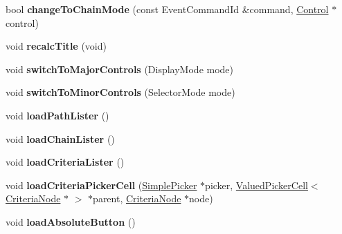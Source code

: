 \begin{DoxyCompactItemize}
\item 
bool {\bfseries change\+To\+Chain\+Mode} (const Event\+Command\+Id \&command, \hyperlink{classControl}{Control} $\ast$control)\hypertarget{classNavComputer_a4160e1e071621007d2a7ed95fa3bb8d1}{}\label{classNavComputer_a4160e1e071621007d2a7ed95fa3bb8d1}

\item 
void {\bfseries recalc\+Title} (void)\hypertarget{classNavComputer_adf4d1b79fdc9721951d9191cf7a92daa}{}\label{classNavComputer_adf4d1b79fdc9721951d9191cf7a92daa}

\item 
void {\bfseries switch\+To\+Major\+Controls} (Display\+Mode mode)\hypertarget{classNavComputer_accc971bdc375706f9e56fa0e5e37c5eb}{}\label{classNavComputer_accc971bdc375706f9e56fa0e5e37c5eb}

\item 
void {\bfseries switch\+To\+Minor\+Controls} (Selector\+Mode mode)\hypertarget{classNavComputer_a22eb0541f56ec32eb9a62a957b3a925d}{}\label{classNavComputer_a22eb0541f56ec32eb9a62a957b3a925d}

\item 
void {\bfseries load\+Path\+Lister} ()\hypertarget{classNavComputer_a3793d30f6641583a69bf774f9c3a4168}{}\label{classNavComputer_a3793d30f6641583a69bf774f9c3a4168}

\item 
void {\bfseries load\+Chain\+Lister} ()\hypertarget{classNavComputer_a0a5d78f642a3d40fd7e5805f20f2d65a}{}\label{classNavComputer_a0a5d78f642a3d40fd7e5805f20f2d65a}

\item 
void {\bfseries load\+Criteria\+Lister} ()\hypertarget{classNavComputer_a26aebabb99ba7ee951de1d9a36b73897}{}\label{classNavComputer_a26aebabb99ba7ee951de1d9a36b73897}

\item 
void {\bfseries load\+Criteria\+Picker\+Cell} (\hyperlink{classSimplePicker}{Simple\+Picker} $\ast$picker, \hyperlink{classValuedPickerCell}{Valued\+Picker\+Cell}$<$ \hyperlink{classCriteriaNode}{Criteria\+Node} $\ast$ $>$ $\ast$parent, \hyperlink{classCriteriaNode}{Criteria\+Node} $\ast$node)\hypertarget{classNavComputer_a9efe8e9515b07f390de2ce7496fab92f}{}\label{classNavComputer_a9efe8e9515b07f390de2ce7496fab92f}

\item 
void {\bfseries load\+Absolute\+Button} ()\hypertarget{classNavComputer_ab6f52ed088d3bb8488365aa177c3f68a}{}\label{classNavComputer_ab6f52ed088d3bb8488365aa177c3f68a}


\end{DoxyCompactItemize}
